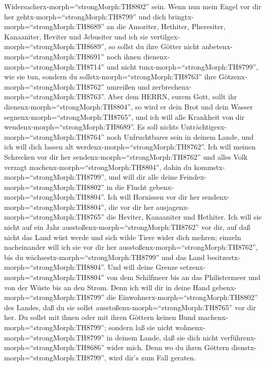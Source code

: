 Widersacherx-morph=``strongMorph:TH8802'' sein.  Wenn nun
mein Engel vor dir her gehtx-morph=``strongMorph:TH8799'' und dich
bringtx-morph=``strongMorph:TH8689'' an die Amoriter, Hethiter,
Pheresiter, Kanaaniter, Heviter und Jebusiter und ich sie
vertilgex-morph=``strongMorph:TH8689'',  so sollst du ihre
Götter nicht anbetenx-morph=``strongMorph:TH8691'' noch ihnen
dienenx-morph=``strongMorph:TH8714'' und nicht
tunx-morph=``strongMorph:TH8799'', wie sie tun, sondern du
sollstx-morph=``strongMorph:TH8763'' ihre
Götzenx-morph=``strongMorph:TH8762'' umreißen und
zerbrechenx-morph=``strongMorph:TH8763''.  Aber dem HERRN,
eurem Gott, sollt ihr dienenx-morph=``strongMorph:TH8804'', so wird er
dein Brot und dein Wasser segnenx-morph=``strongMorph:TH8765'', und ich
will alle Krankheit von dir wendenx-morph=``strongMorph:TH8689''.
 Es soll nichts Unträchtigesx-morph=``strongMorph:TH8764''
noch Unfruchtbares sein in deinem Lande, und ich will dich lassen alt
werdenx-morph=``strongMorph:TH8762''.  Ich will meinen
Schrecken vor dir her sendenx-morph=``strongMorph:TH8762'' und alles
Volk verzagt machenx-morph=``strongMorph:TH8804'', dahin du
kommstx-morph=``strongMorph:TH8799'', und will dir alle deine
Feindex-morph=``strongMorph:TH8802'' in die Flucht
gebenx-morph=``strongMorph:TH8804''.  Ich will Hornissen
vor dir her sendenx-morph=``strongMorph:TH8804'', die vor dir her
ausjagenx-morph=``strongMorph:TH8765'' die Heviter, Kanaaniter und
Hethiter.  Ich will sie nicht auf ein Jahr
ausstoßenx-morph=``strongMorph:TH8762'' vor dir, auf daß nicht das Land
wüst werde und sich wilde Tiere wider dich mehren;  einzeln
nacheinander will ich sie vor dir her
ausstoßenx-morph=``strongMorph:TH8762'', bis du
wächsestx-morph=``strongMorph:TH8799'' und das Land
besitzestx-morph=``strongMorph:TH8804''.  Und will deine
Grenze setzenx-morph=``strongMorph:TH8804'' von dem Schilfmeer bis an
das Philistermeer und von der Wüste bis an den Strom. Denn ich will dir
in deine Hand gebenx-morph=``strongMorph:TH8799'' die
Einwohnerx-morph=``strongMorph:TH8802'' des Landes, daß du sie sollst
ausstoßenx-morph=``strongMorph:TH8765'' vor dir her.  Du
sollst mit ihnen oder mit ihren Göttern keinen Bund
machenx-morph=``strongMorph:TH8799'';  sondern laß sie
nicht wohnenx-morph=``strongMorph:TH8799'' in deinem Lande, daß sie dich
nicht verführenx-morph=``strongMorph:TH8686'' wider mich. Denn wo du
ihren Göttern dienstx-morph=``strongMorph:TH8799'', wird dir's zum Fall
geraten.

